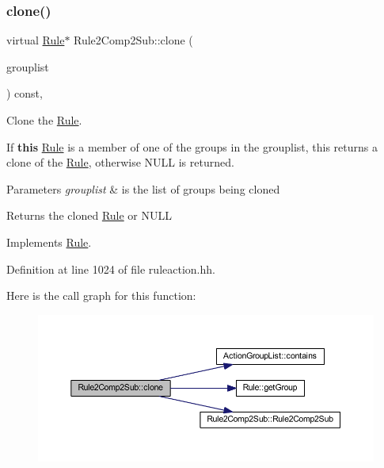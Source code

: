 \subsubsection{\texorpdfstring{clone()}{clone()}}
{\footnotesize\ttfamily virtual \mbox{\hyperlink{class_rule}{Rule}}$\ast$ Rule2\+Comp2\+Sub\+::clone (\begin{DoxyParamCaption}\item[{const \mbox{\hyperlink{class_action_group_list}{Action\+Group\+List}} \&}]{grouplist }\end{DoxyParamCaption}) const\hspace{0.3cm}{\ttfamily [inline]}, {\ttfamily [virtual]}}



Clone the \mbox{\hyperlink{class_rule}{Rule}}. 

If {\bfseries{this}} \mbox{\hyperlink{class_rule}{Rule}} is a member of one of the groups in the grouplist, this returns a clone of the \mbox{\hyperlink{class_rule}{Rule}}, otherwise N\+U\+LL is returned. 
\begin{DoxyParams}{Parameters}
{\em grouplist} & is the list of groups being cloned \\
\hline
\end{DoxyParams}
\begin{DoxyReturn}{Returns}
the cloned \mbox{\hyperlink{class_rule}{Rule}} or N\+U\+LL 
\end{DoxyReturn}


Implements \mbox{\hyperlink{class_rule_a70de90a76461bfa7ea0b575ce3c11e4d}{Rule}}.



Definition at line 1024 of file ruleaction.\+hh.

Here is the call graph for this function\+:
\nopagebreak
\begin{figure}[H]
\begin{center}
\leavevmode
\includegraphics[width=350pt]{class_rule2_comp2_sub_a8c99299a5ecf4ac0b670a69a451391d9_cgraph}
\end{center}
\end{figure}
\mbox{\label{class_rule2_comp2_sub_ac179137322a0b29d73b7ab377426cbfc}} 
